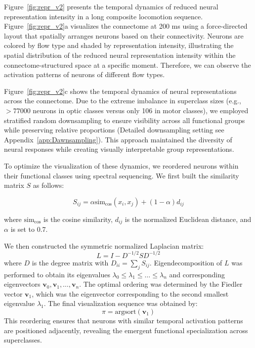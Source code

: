 \documentclass{article}
\theoremstyle{plain}
\theoremstyle{definition}
\theoremstyle{remark}
\begin{document}
Figure~\ref{fig:repr_v2} presents the temporal dynamics of reduced neural representation intensity in a long composite locomotion sequence. Figure~\ref{fig:repr_v2}a visualizes the connectome at 200 ms using a force-directed layout that spatially arranges neurons based on their connectivity. Neurons are colored by flow type and shaded by representation intensity, illustrating the spatial distribution of the reduced neural representation intensity within the connectome-structured space at a specific moment. Therefore, we can observe the activation patterns of neurons of different flow types.

Figure~\ref{fig:repr_v2}c shows the temporal dynamics of neural representations across the connectome. Due to the extreme imbalance in superclass sizes (e.g., $>77000$ neurons in optic classes versus only 106 in motor classes), we employed stratified random downsampling to ensure visibility across all functional groups while preserving relative proportions (Detailed downsampling setting see Appendix~\ref{app:Dawnsampling}). This approach maintained the diversity of neural responses while creating visually interpretable group representations.

To optimize the visualization of these dynamics, we reordered neurons within their functional classes using spectral sequencing. We first built the similarity matrix $S$ as follows:

\begin{equation}
S_{ij} = \alpha \text{sim}_{\text{cos}}(x_i, x_j) + (1 - \alpha)d_{ij}
\end{equation}

where $\text{sim}_{\text{cos}}$ is the cosine similarity, $d_{ij}$ is the normalized Euclidean distance, and $\alpha$ is set to 0.7.

We then constructed the symmetric normalized Laplacian matrix:
\begin{equation}
L = I - D^{-1/2} S D^{-1/2}
\end{equation}
where $D$ is the degree matrix with $D_{ii} = \sum_j S_{ij}$. Eigendecomposition of $L$ was performed to obtain its eigenvalues $\lambda_0 \le \lambda_1 \le \dots \le \lambda_n$ and corresponding eigenvectors $\mathbf{v}_0, \mathbf{v}_1, \dots, \mathbf{v}_n$. The optimal ordering was determined by the Fiedler vector $\mathbf{v}_1$, which was the eigenvector corresponding to the second smallest eigenvalue $\lambda_1$. The final visualization sequence was obtained by:
\begin{equation}
\pi = \text{argsort}(\mathbf{v}_1)
\end{equation}
This reordering ensures that neurons with similar temporal activation patterns are positioned adjacently, revealing the emergent functional specialization across superclasses.
\end{document}
